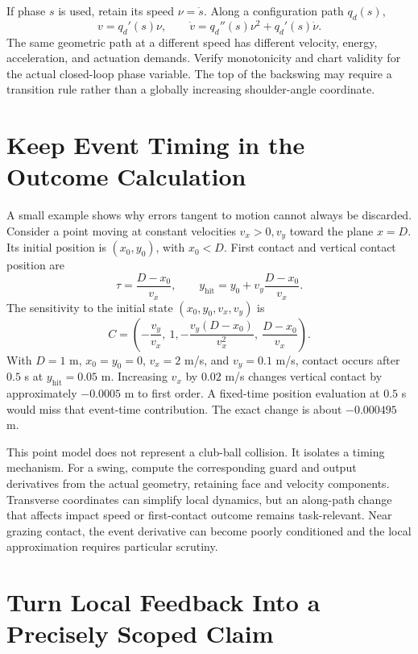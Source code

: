If phase $s$ is used, retain its speed $\nu=\dot s$. Along a configuration path $q_d(s)$,
\begin{equation}
v=q_d'(s)\nu,\qquad
\dot v=q_d''(s)\nu^2+q_d'(s)\dot\nu .
\end{equation}
The same geometric path at a different speed has different velocity, energy, acceleration, and actuation demands. Verify monotonicity and chart validity for the actual closed-loop phase variable. The top of the backswing may require a transition rule rather than a globally increasing shoulder-angle coordinate.

\section{Keep Event Timing in the Outcome Calculation}

A small example shows why errors tangent to motion cannot always be discarded. Consider a point moving at constant velocities $v_x>0,v_y$ toward the plane $x=D$. Its initial position is $(x_0,y_0)$, with $x_0<D$. First contact and vertical contact position are
\begin{equation}
\tau=\frac{D-x_0}{v_x},\qquad
y_{\mathrm{hit}}=y_0+v_y\frac{D-x_0}{v_x} .
\end{equation}
The sensitivity to the initial state $(x_0,y_0,v_x,v_y)$ is
\begin{equation}
C=\left(-\frac{v_y}{v_x},\ 1,
-\frac{v_y(D-x_0)}{v_x^2},\ \frac{D-x_0}{v_x}\right).
\end{equation}
With $D=1$ m, $x_0=y_0=0$, $v_x=2$ m/s, and $v_y=0.1$ m/s, contact occurs after $0.5$ s at $y_{\mathrm{hit}}=0.05$ m. Increasing $v_x$ by $0.02$ m/s changes vertical contact by approximately $-0.0005$ m to first order. A fixed-time position evaluation at $0.5$ s would miss that event-time contribution. The exact change is about $-0.000495$ m.

This point model does not represent a club-ball collision. It isolates a timing mechanism. For a swing, compute the corresponding guard and output derivatives from the actual geometry, retaining face and velocity components. Transverse coordinates can simplify local dynamics, but an along-path change that affects impact speed or first-contact outcome remains task-relevant. Near grazing contact, the event derivative can become poorly conditioned and the local approximation requires particular scrutiny.

\section{Turn Local Feedback Into a Precisely Scoped Claim}

